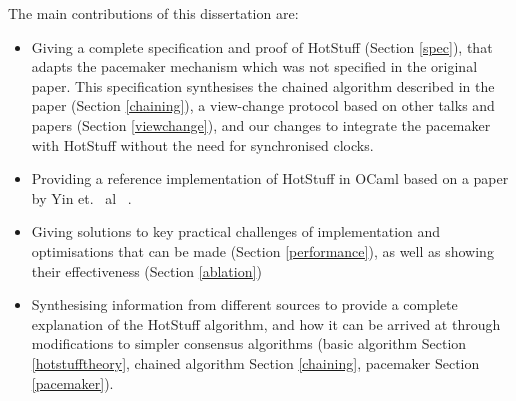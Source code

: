 The main contributions of this dissertation are:
\begin{itemize}
	\item Giving a complete specification and proof of HotStuff (Section \ref{spec}), that adapts the pacemaker mechanism which was not specified in the original paper. This specification synthesises the chained algorithm described in the paper (Section \ref{chaining}), a view-change protocol based on other talks and papers (Section \ref{viewchange}), and our changes to integrate the pacemaker with HotStuff without the need for synchronised clocks.
	\item Providing a reference implementation of HotStuff in OCaml based on a paper by Yin et. ~al~ \cite{yinHotStuffBFTConsensus2019}.
	\item Giving solutions to key practical challenges of implementation and optimisations that can be made (Section \ref{performance}), as well as showing their effectiveness (Section \ref{ablation})
	\item Synthesising information from different sources to provide a complete explanation of the HotStuff algorithm, and how it can be arrived at through modifications to simpler consensus algorithms (basic algorithm Section \ref{hotstufftheory}, chained algorithm Section \ref{chaining}, pacemaker Section \ref{pacemaker}).
\end{itemize}
